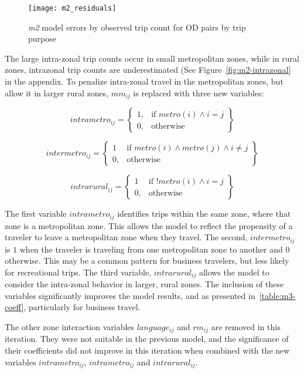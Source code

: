 \begin{figure}[H]
\centering
\texttt{[image: m2\_residuals]}
\caption{\textit{m2} model errors by observed trip count for OD pairs by trip purpose}
\label{fig:m2_residuals}
\end{figure}

The large intra-zonal trip counts occur in small metropolitan zones, while in rural zones, intrazonal trip counts are underestimated (See Figure~\ref{fig:m2-intrazonal} in the appendix. To penalize intra-zonal travel in the metropolitan zones, but allow it in larger rural zones, $mm_{ij}$  is replaced with three new variables:

	$$	
	intrametro_{ij} = \left.
  \begin{cases}
    1, & \text{if } metro(i) \wedge i = j \\
    0, & \text{otherwise }
  \end{cases}
  \right\}
	$$
  
	$$	
	intermetro_{ij} = \left.
  \begin{cases}
    1 & \text{if } metro(i) \wedge metro(j) \wedge i \neq j \\
    0, & \text{otherwise } 
  \end{cases}
  \right\}
	$$  
	
	$$	
	intrarural_{ij} = \left.
  \begin{cases}
    1 & \text{if } !metro(i) \wedge i = j \\
    0, & \text{otherwise } 
  \end{cases}
  \right\}
	$$

The first variable $intrametro_{ij}$ identifies trips within the same zone, where that zone is a metropolitan zone. This allows the model to reflect the propensity of a traveler to leave a metropolitan zone when they travel. The second, $intermetro_{ij}$ is $1$ when the traveler is traveling from one metropolitan zone to another and $0$ otherwise. This may be a common pattern for business travelers, but less likely for recreational trips. The third variable, $intrarural_{ij}$ allows the model to consider the intra-zonal behavior in larger, rural zones. The inclusion of these variables significantly improves the model results, and as presented in~\ref{table:m3-coeff}, particularly for business travel.

The other zone interaction variables $language_{ij}$  and $rm_{ij}$  are removed in this iteration. They were not suitable in the previous model, and the significance of their coefficients did not improve in this iteration when combined with the new variables $intrametro_{ij}$,  $intrametro_{ij}$ and $intrarural_{ij}$.


